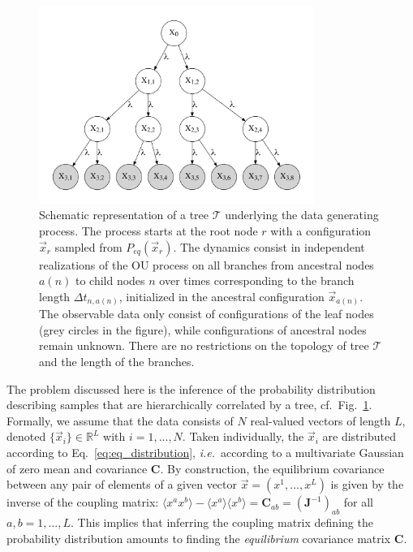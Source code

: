 \documentclass[preprint,amsmath,amssymb,superscriptaddress,showpacs,pre]{revtex4-1}
\newcommand{\ie}{\emph{i.e.}}
\def\vx{\vec x}
\begin{document}
\begin{figure}[!htb]
	\includegraphics[width=0.8\textwidth]{Figures/tree.pdf}
	\caption{Schematic representation of a tree $\mathcal{T}$ underlying the data generating process. The process starts at the root node $r$ with a configuration $\vx_r$ sampled from $P_{eq}(\vx_r)$. The dynamics consist in independent realizations of the OU process on all branches from ancestral nodes $a(n)$ to child nodes $n$ over times corresponding to the branch length $\Delta t_{n,a(n)}$, initialized in the ancestral configuration $\vx_{a(n)}$. The observable data only consist of configurations of the leaf nodes (grey circles in the figure), while configurations of ancestral nodes remain unknown. There are no restrictions on the topology of tree $\mathcal{T}$ and the length of the branches.}
	\label{fig:sample_tree}
\end{figure}


The problem discussed here is the inference of the probability distribution describing samples that are hierarchically correlated by a tree, cf.~Fig.~\ref{fig:sample_tree}. 
Formally, we assume that the data consists of $N$ real-valued vectors of length $L$, denoted $\{\vx_i\}\in\mathbb{R}^L$ with $i=1,...,N$. 
Taken individually, the $\vx_i$ are distributed according to Eq.~\ref{eq:eq_distribution}, \ie~according to a multivariate Gaussian of zero mean and covariance $\bm C$.
By construction, the equilibrium covariance between any pair of elements of a given vector $\vx=(x^1,...,x^L)$ is given by the inverse of the coupling matrix: $\langle x^a x^b\rangle-\langle x^a\rangle\langle x^b\rangle = \bm C_{ab} = (\bm J^{-1})_{ab}$ for all $a,b=1,...,L$. 
This implies that inferring the coupling matrix defining the probability distribution amounts to finding the \emph{equilibrium} covariance matrix $\mathbf{C}$.  
\end{document}
